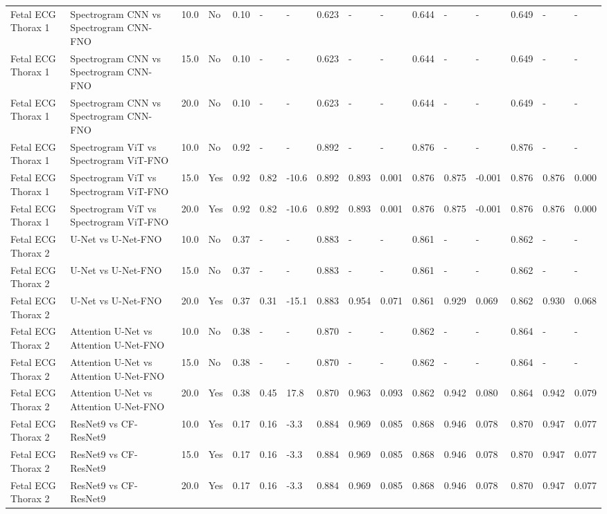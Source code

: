 \begin{longtable}{llllllllllllllll}
Fetal ECG Thorax 1 & Spectrogram CNN vs Spectrogram CNN-FNO & 10.0 & No & 0.10 & - & - & 0.623 & - & - & 0.644 & - & - & 0.649 & - & - \\
Fetal ECG Thorax 1 & Spectrogram CNN vs Spectrogram CNN-FNO & 15.0 & No & 0.10 & - & - & 0.623 & - & - & 0.644 & - & - & 0.649 & - & - \\
Fetal ECG Thorax 1 & Spectrogram CNN vs Spectrogram CNN-FNO & 20.0 & No & 0.10 & - & - & 0.623 & - & - & 0.644 & - & - & 0.649 & - & - \\
Fetal ECG Thorax 1 & Spectrogram ViT vs Spectrogram ViT-FNO & 10.0 & No & 0.92 & - & - & 0.892 & - & - & 0.876 & - & - & 0.876 & - & - \\
Fetal ECG Thorax 1 & Spectrogram ViT vs Spectrogram ViT-FNO & 15.0 & Yes & 0.92 & 0.82 & -10.6 & 0.892 & 0.893 & 0.001 & 0.876 & 0.875 & -0.001 & 0.876 & 0.876 & 0.000 \\
Fetal ECG Thorax 1 & Spectrogram ViT vs Spectrogram ViT-FNO & 20.0 & Yes & 0.92 & 0.82 & -10.6 & 0.892 & 0.893 & 0.001 & 0.876 & 0.875 & -0.001 & 0.876 & 0.876 & 0.000 \\
Fetal ECG Thorax 2 & U-Net vs U-Net-FNO & 10.0 & No & 0.37 & - & - & 0.883 & - & - & 0.861 & - & - & 0.862 & - & - \\
Fetal ECG Thorax 2 & U-Net vs U-Net-FNO & 15.0 & No & 0.37 & - & - & 0.883 & - & - & 0.861 & - & - & 0.862 & - & - \\
Fetal ECG Thorax 2 & U-Net vs U-Net-FNO & 20.0 & Yes & 0.37 & 0.31 & -15.1 & 0.883 & 0.954 & 0.071 & 0.861 & 0.929 & 0.069 & 0.862 & 0.930 & 0.068 \\
Fetal ECG Thorax 2 & Attention U-Net vs Attention U-Net-FNO & 10.0 & No & 0.38 & - & - & 0.870 & - & - & 0.862 & - & - & 0.864 & - & - \\
Fetal ECG Thorax 2 & Attention U-Net vs Attention U-Net-FNO & 15.0 & No & 0.38 & - & - & 0.870 & - & - & 0.862 & - & - & 0.864 & - & - \\
Fetal ECG Thorax 2 & Attention U-Net vs Attention U-Net-FNO & 20.0 & Yes & 0.38 & 0.45 & 17.8 & 0.870 & 0.963 & 0.093 & 0.862 & 0.942 & 0.080 & 0.864 & 0.942 & 0.079 \\
Fetal ECG Thorax 2 & ResNet9 vs CF-ResNet9 & 10.0 & Yes & 0.17 & 0.16 & -3.3 & 0.884 & 0.969 & 0.085 & 0.868 & 0.946 & 0.078 & 0.870 & 0.947 & 0.077 \\
Fetal ECG Thorax 2 & ResNet9 vs CF-ResNet9 & 15.0 & Yes & 0.17 & 0.16 & -3.3 & 0.884 & 0.969 & 0.085 & 0.868 & 0.946 & 0.078 & 0.870 & 0.947 & 0.077 \\
Fetal ECG Thorax 2 & ResNet9 vs CF-ResNet9 & 20.0 & Yes & 0.17 & 0.16 & -3.3 & 0.884 & 0.969 & 0.085 & 0.868 & 0.946 & 0.078 & 0.870 & 0.947 & 0.077 \\

\end{longtable}
